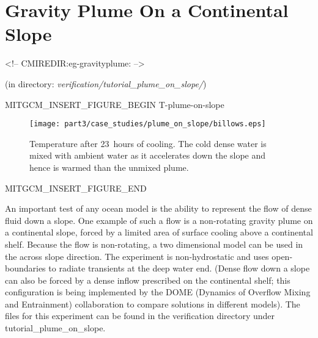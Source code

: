 \section{Gravity Plume On a Continental Slope}
\label{www:tutorials}
\label{sect:eg-gravityplume}
\begin{rawhtml}
<!-- CMIREDIR:eg-gravityplume: -->
\end{rawhtml}
\begin{center}
(in directory: {\it verification/tutorial\_plume\_on\_slope/})
\end{center}

\begin{rawhtml}MITGCM_INSERT_FIGURE_BEGIN T-plume-on-slope\end{rawhtml}
\begin{figure}
\begin{center}
\texttt{[image: part3/case\_studies/plume\_on\_slope/billows.eps]}
\end{center}
\caption{Temperature after 23~hours of cooling. The cold dense water is
mixed with ambient water as it accelerates down the slope and hence
is warmed than the unmixed plume.
}
\label{fig:T-plume-on-slope}
\end{figure}
\begin{rawhtml}MITGCM_INSERT_FIGURE_END\end{rawhtml}

An important test of any ocean model is the ability to represent the
flow of dense fluid down a slope. One example of such a flow is a
non-rotating gravity plume on a continental slope, forced by a limited
area of surface cooling above a continental shelf. Because the flow is
non-rotating, a two dimensional model can be used in the across slope
direction. The experiment is non-hydrostatic and uses open-boundaries
to radiate transients at the deep water end.  (Dense flow down a slope
can also be forced by a dense inflow prescribed on the continental
shelf; this configuration is being implemented by the DOME (Dynamics
of Overflow Mixing and Entrainment) collaboration to compare solutions
in different models). The files for this experiment can be found in
the verification directory under tutorial\_plume\_on\_slope.

